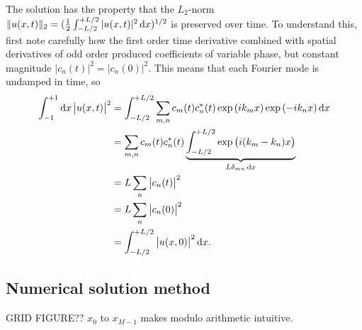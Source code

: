 The solution has the property that the $L_2$-norm $\Vert u(x,t) \Vert_2 = ( \frac{1}{2} \int_{-L/2}^{+L/2} |u(x,t)|^2 \dif x )^{1/2}$ is preserved over time.
To understand this, first note carefully how the first order time derivative combined with spatial derivatives of odd order produced coefficients of variable phase, but constant magnitude $|c_n(t)|^2 = |c_n(0)|^2$.
This means that each Fourier mode is undamped in time, so
\begin{equation}
\begin{split}
\int_{-1}^{+1} \dif x \left| u(x,t) \right|^2 &= \int_{-L/2}^{+L/2} \sum_{m,n} c_m(t) c_n^*(t) \exp{(i k_m x)} \exp{(-i k_n x)} \dif x \\
                                              &= \sum_{m,n} c_m(t) c_n^*(t) \underbrace{\int_{-L/2}^{+L/2} \exp{\left(i(k_m-k_n)x\right)}}_{L \delta_{m n} \dif x} \\
											  &= L \sum_n \left| c_n(t) \right|^2 \\
											  &= L \sum_n \left| c_n(0) \right|^2 \\
											  &= \int_{-L/2}^{+L/2} \left| u(x,0) \right|^2 \dif x.
\end{split}
\end{equation}

\subsection{Numerical solution method}

GRID FIGURE?? $x_0$ to $x_{M-1}$ makes modulo arithmetic intuitive.

